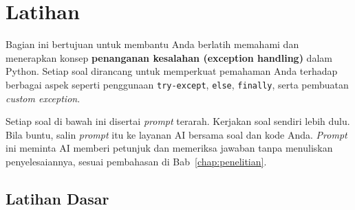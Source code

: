 \section{Latihan}

Bagian ini bertujuan untuk membantu Anda berlatih memahami dan menerapkan konsep \textbf{penanganan kesalahan (exception handling)} dalam Python.  
Setiap soal dirancang untuk memperkuat pemahaman Anda terhadap berbagai aspek seperti penggunaan \texttt{try-except}, \texttt{else}, \texttt{finally}, serta pembuatan \textit{custom exception}.

Setiap soal di bawah ini disertai \textit{prompt} terarah. Kerjakan soal sendiri lebih dulu. Bila buntu, salin \textit{prompt} itu ke layanan AI bersama soal dan kode Anda. \textit{Prompt} ini meminta AI memberi petunjuk dan memeriksa jawaban tanpa menuliskan penyelesaiannya, sesuai pembahasan di Bab~\ref{chap:penelitian}.

\subsection*{Latihan Dasar}

